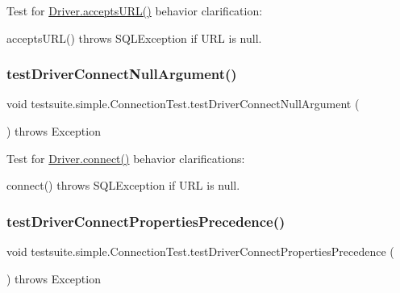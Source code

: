 Test for \mbox{\hyperlink{classcom_1_1mysql_1_1cj_1_1jdbc_1_1_non_registering_driver_a647f9685378b944a3c5c6d9f9c47d7f1}{Driver.\+accepts\+U\+R\+L()}} behavior clarification\+:
\begin{DoxyItemize}
\item accepts\+U\+R\+L() throws S\+Q\+L\+Exception if U\+RL is null. 
\end{DoxyItemize}\mbox{\label{classtestsuite_1_1simple_1_1_connection_test_aafe08f45b914b4068e82456b8408401b}} 
\subsubsection{\texorpdfstring{test\+Driver\+Connect\+Null\+Argument()}{testDriverConnectNullArgument()}}
{\footnotesize\ttfamily void testsuite.\+simple.\+Connection\+Test.\+test\+Driver\+Connect\+Null\+Argument (\begin{DoxyParamCaption}{ }\end{DoxyParamCaption}) throws Exception}

Test for \mbox{\hyperlink{classcom_1_1mysql_1_1cj_1_1jdbc_1_1_non_registering_driver_ab3fd3d522550db032eab6c240b554e3e}{Driver.\+connect()}} behavior clarifications\+:
\begin{DoxyItemize}
\item connect() throws S\+Q\+L\+Exception if U\+RL is null. 
\end{DoxyItemize}\mbox{\label{classtestsuite_1_1simple_1_1_connection_test_a92c8851ac00778b02dd81c2bb90d2d59}} 
\subsubsection{\texorpdfstring{test\+Driver\+Connect\+Properties\+Precedence()}{testDriverConnectPropertiesPrecedence()}}
{\footnotesize\ttfamily void testsuite.\+simple.\+Connection\+Test.\+test\+Driver\+Connect\+Properties\+Precedence (\begin{DoxyParamCaption}{ }\end{DoxyParamCaption}) throws Exception}


